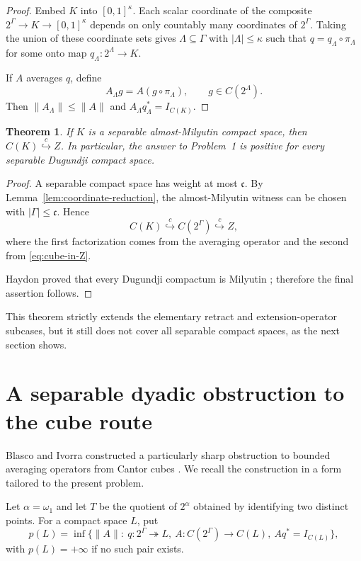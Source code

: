 \documentclass[11pt]{article}
\newtheorem{theorem}{Theorem}[section]
\theoremstyle{definition}
\theoremstyle{remark}
\newcommand{\C}{C}
\newcommand{\cc}{\mathfrak c}
\newcommand{\Id}{I}
\newcommand{\hookc}{\stackrel{c}{\hookrightarrow}}
\begin{document}
\begin{proof}
Embed $K$ into $[0,1]^\kappa$.  Each scalar coordinate of the composite
$2^\Gamma\to K\to[0,1]^\kappa$ depends on only countably many coordinates
of $2^\Gamma$.  Taking the union of these coordinate sets gives
$\Lambda\subseteq\Gamma$ with $|\Lambda|\leq\kappa$ such that
$q=q_\Lambda\circ\pi_\Lambda$ for some onto map
$q_\Lambda:2^\Lambda\to K$.

If $A$ averages $q$, define
\[
       A_\Lambda g=A(g\circ\pi_\Lambda),
       \qquad g\in\C(2^\Lambda).
\]
Then $\|A_\Lambda\|\leq\|A\|$ and
$A_\Lambda q_\Lambda^*=\Id_{\C(K)}$.
\end{proof}

\begin{theorem}\label{thm:almost-milyutin-positive}
If $K$ is a separable almost-Milyutin compact space, then
$\C(K)\hookc Z$.  In particular, the answer to Problem~1 is positive for
every separable Dugundji compact space.
\end{theorem}

\begin{proof}
A separable compact space has weight at most $\cc$.  By
Lemma~\ref{lem:coordinate-reduction}, the almost-Milyutin witness can be
chosen with $|\Gamma|\leq\cc$.  Hence
\[
       \C(K)\hookc\C(2^\Gamma)\hookc Z,
\]
where the first factorization comes from the averaging operator and the
second from \eqref{eq:cube-in-Z}.

Haydon proved that every Dugundji compactum is Milyutin
\cite{Haydon74}; therefore the final assertion follows.
\end{proof}

This theorem strictly extends the elementary retract and extension-operator
subcases, but it still does not cover all separable compact spaces, as the
next section shows.

\section{A separable dyadic obstruction to the cube route}

Blasco and Ivorra constructed a particularly sharp obstruction to bounded
averaging operators from Cantor cubes \cite{BlascoIvorra94}.  We recall the
construction in a form tailored to the present problem.

Let $\alpha=\omega_1$ and let $T$ be the quotient of $2^\alpha$ obtained by
identifying two distinct points.  For a compact space $L$, put
\begin{equation}\label{eq:pL}
 p(L)=\inf\bigl\{\|A\|:\ q:2^\Gamma\twoheadrightarrow L,\
       A:\C(2^\Gamma)\to\C(L),\ Aq^*=\Id_{\C(L)}\bigr\},
\end{equation}
with $p(L)=+\infty$ if no such pair exists.
\end{document}
